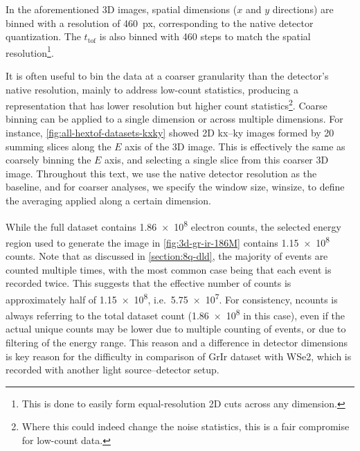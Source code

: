 In the aforementioned 3D images, spatial dimensions ($x$ and $y$ directions) are binned with a resolution of \qty{460}{px}, corresponding to the native detector quantization. The $t_{\text{tof}}$ is also binned with \num{460} steps to match the spatial resolution\footnote{This is done to easily form equal-resolution 2D cuts across any dimension.}. 

It is often useful to bin the data at a coarser granularity than the detector's native resolution, mainly to address low-count statistics, producing a representation that has lower resolution but higher count statistics\footnote{Where this could indeed change the noise statistics, this is a fair compromise for low-count data.}. Coarse binning can be applied to a single dimension or across multiple dimensions. For instance, \cref{fig:all-hextof-datasets-kxky} showed 2D \gls{kx}--\gls{ky} images formed by \num{20} summing slices along the $E$ axis of the 3D image. This is effectively the same as coarsely binning the $E$ axis, and selecting a single slice from this coarser 3D image. Throughout this text, we use the native detector resolution as the baseline, and for coarser analyses, we specify the window size, \gls{winsize}, to define the averaging applied along a certain dimension. 

While the full dataset contains \num{1.86e8} electron counts, the selected energy region used to generate the image in \cref{fig:3d-gr-ir-186M} contains \num{1.15e8} counts. Note that as discussed in \cref{section:8q-dld}, the majority of events are counted multiple times, with the most common case being that each event is recorded twice. This suggests that the effective number of counts is approximately half of \num{1.15e8}, i.e.\ \num{5.75e7}. For consistency, \gls{ncounts} is always referring to the total dataset count (\num{1.86e8} in this case), even if the actual unique counts may be lower due to multiple counting of events, or due to filtering of the energy range. This reason and a difference in detector dimensions is key reason for the difficulty in comparison of \gls{GrIr} dataset with \gls{WSe2}, which is recorded with another light source--detector setup.

